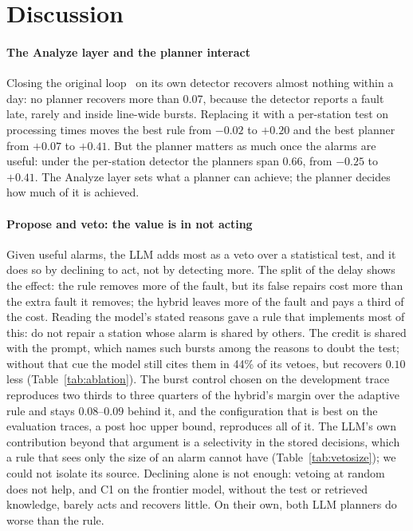\documentclass[preprint,11pt]{elsarticle}
\begin{document}
\section{Discussion}
\label{sec:discussion}

\paragraph{The Analyze layer and the planner interact}
Closing the original loop~\cite{sanchez2020selfstar} on its own detector recovers almost nothing within a day: no planner recovers more than 0.07, because the detector reports a fault late, rarely and inside line-wide bursts. Replacing it with a per-station test on processing times moves the best rule from $-0.02$ to $+0.20$ and the best planner from $+0.07$ to $+0.41$. But the planner matters as much once the alarms are useful: under the per-station detector the planners span 0.66, from $-0.25$ to $+0.41$. The Analyze layer sets what a planner can achieve; the planner decides how much of it is achieved.

\paragraph{Propose and veto: the value is in not acting}
Given useful alarms, the LLM adds most as a veto over a statistical test, and it does so by declining to act, not by detecting more. The split of the delay shows the effect: the rule removes more of the fault, but its false repairs cost more than the extra fault it removes; the hybrid leaves more of the fault and pays a third of the cost. Reading the model's stated reasons gave a rule that implements most of this: do not repair a station whose alarm is shared by others. The credit is shared with the prompt, which names such bursts among the reasons to doubt the test; without that cue the model still cites them in 44\% of its vetoes, but recovers $0.10$ less (Table~\ref{tab:ablation}). The burst control chosen on the development trace reproduces two thirds to three quarters of the hybrid's margin over the adaptive rule and stays $0.08$--$0.09$ behind it, and the configuration that is best on the evaluation traces, a post hoc upper bound, reproduces all of it. The LLM's own contribution beyond that argument is a selectivity in the stored decisions, which a rule that sees only the size of an alarm cannot have (Table~\ref{tab:vetosize}); we could not isolate its source. Declining alone is not enough: vetoing at random does not help, and C1 on the frontier model, without the test or retrieved knowledge, barely acts and recovers little. On their own, both LLM planners do worse than the rule.
\end{document}
